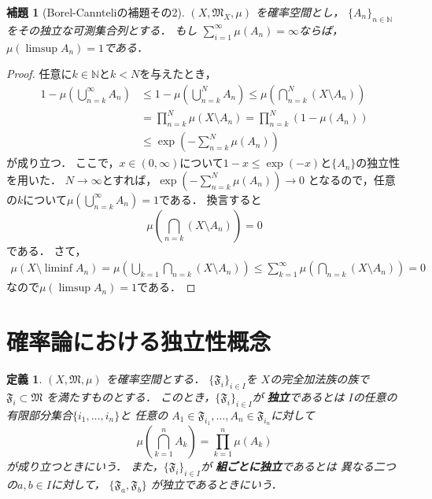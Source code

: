 \documentclass[leqno, a4paper, 12pt]{jsarticle}
\newtheorem{lem}[thm]{補題}
\newtheorem{df}[thm]{定義}
\newcommand{\nn}{\mathbb{N}}
\begin{document}
\begin{lem}[Borel-Cannteliの補題その2]\label{lem:bc2}
$(X, \mathfrak{M}_X, \mu)$
を確率空間とし，
$\{A_n\}_{n\in \nn}$をその独立な可測集合列とする．
もし
$\sum_{i=1}^{\infty}\mu(A_n)=\infty$ならば，
$\mu(\limsup A_n)=1$である．
\end{lem}
\begin{proof}
任意に$k\in \nn$と$k<N$を与えたとき，
\begin{align*}
1-\mu\left(\bigcup_{n=k}^{\infty}A_n\right)
&\le 1-\mu\left(\bigcup_{n=k}^NA_n\right)
\le
\mu\left(\bigcap_{n=k}^N (X\setminus A_n)\right)\\
&=\prod_{n=k}^N\mu(X\setminus A_n)=\prod_{n=k}^N(1-\mu(A_n))\\
&\le \exp\left(-\sum_{n=k}^N\mu(A_n)\right)
\end{align*}
が成り立つ．
ここで，$x\in (0, \infty)$について$1-x\le \exp(-x)$と$\{A_n\}$の独立性を用いた．
$N\to \infty$とすれば，$\exp(-\sum_{n=k}^N\mu(A_n))\to 0$
となるので，任意の$k$について$\mu(\bigcup_{n=k}^{\infty}A_n)=1$である．
換言すると
\[
\mu\left(\bigcap_{n=k}(X\setminus A_n)\right)=0
\]である．
さて，
\begin{align*}
\mu(X\setminus \liminf A_n)=\mu\left(\bigcup_{k=1}\bigcap_{n=k} (X\setminus A_{n})\right)\le 
\sum_{k=1}^{\infty}\mu\left(\bigcap_{n=k}(X\setminus A_n)\right)=0
\end{align*}
なので$\mu(\limsup A_n)=1$である．
\end{proof}




\section{確率論における独立性概念}
\begin{df}
$(X, \mathfrak{M}, \mu)$
を確率空間とする．
$\{\mathfrak{F}_{i}\}_{i\in I}$を
$X$の完全加法族の族で
$\mathfrak{F}_{i}\subset \mathfrak{M}$
を満たすものとする．
このとき，$\{\mathfrak{F}_{i}\}_{i\in I}$が
\textbf{独立}であるとは
$I$の任意の有限部分集合$\{i_{1}, \dots, i_{n}\}$と
任意の
$A_{1}\in \mathfrak{F}_{i_{1}}, \dots, 
A_{n}\in \mathfrak{F}_{i_{n}}$に対して
\[
\mu\left(\bigcap_{k=1}^{n}A_{k}\right)
=\prod_{k=1}^{n}\mu\left(A_{k}\right)
\]
が成り立つときにいう．
また，$\{\mathfrak{F}_{i}\}_{i\in I}$が
\textbf{組ごとに独立}であるとは
異なる二つの$a, b\in I$に対して，
$\{\mathfrak{F}_{a}, \mathfrak{F}_{b}\}$
が独立であるときにいう．
\end{df} 
\end{document}
